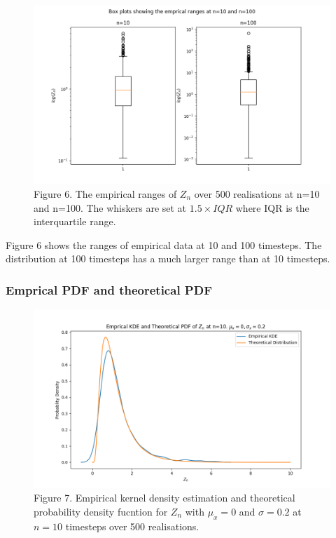 \documentclass{article}
\begin{document}
\begin{figure}[H]
\includegraphics[scale=0.5]{box_plots_a.png} 
\small{Figure 6. The empirical ranges of $Z_n$ over 500 realisations at n=10 and n=100. The whiskers are set at $1.5 \times IQR$ where IQR is the interquartile range.}
\end{figure}

Figure 6 shows the ranges of empirical data at 10 and 100 timesteps. The distribution at 100 timesteps has a much larger range than at 10 timesteps.

\subsubsection{Emprical PDF and theoretical PDF}

\begin{figure}[H]
\includegraphics[scale=0.5]{empirical_pdf_kde_10_a.png} 
\small{Figure 7. Empirical kernel density estimation and theoretical probability density fucntion for $Z_n$ with $\mu_x=0$ and $\sigma=0.2$ at $n=10$ timesteps over 500 realisations.}
\end{figure}
\end{document}
